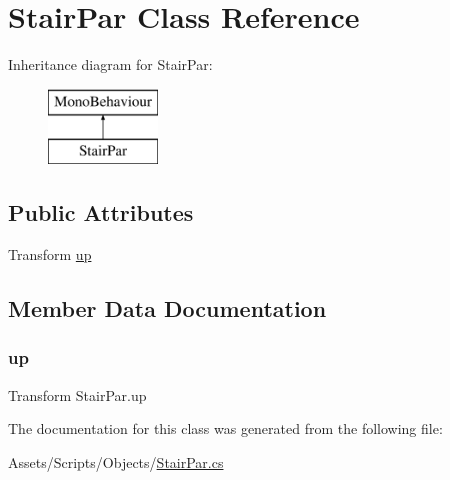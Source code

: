 \hypertarget{class_stair_par}{}\section{Stair\+Par Class Reference}
\label{class_stair_par}
Inheritance diagram for Stair\+Par\+:\begin{figure}[H]
\begin{center}
\leavevmode
\includegraphics[height=2.000000cm]{class_stair_par}
\end{center}
\end{figure}
\subsection*{Public Attributes}
\begin{DoxyCompactItemize}
\item 
Transform \mbox{\hyperlink{class_stair_par_a15f91c7da18e2c921f656f61a1eaa4f1}{up}}
\end{DoxyCompactItemize}


\subsection{Member Data Documentation}
\mbox{\label{class_stair_par_a15f91c7da18e2c921f656f61a1eaa4f1}} 
\subsubsection{\texorpdfstring{up}{up}}
{\footnotesize\ttfamily Transform Stair\+Par.\+up}



The documentation for this class was generated from the following file\+:\begin{DoxyCompactItemize}
\item 
Assets/\+Scripts/\+Objects/\mbox{\hyperlink{_stair_par_8cs}{Stair\+Par.\+cs}}\end{DoxyCompactItemize}
